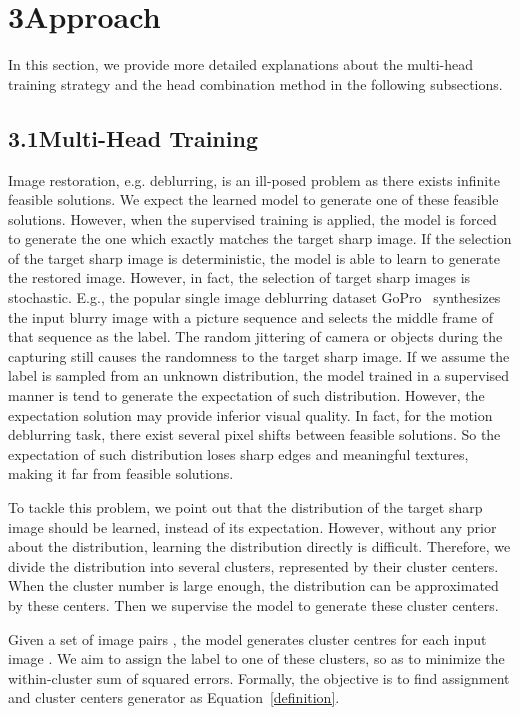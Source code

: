 \documentclass[letterpaper]{article} \usepackage{aaai23}  \usepackage{times}  \usepackage{helvet}  \usepackage{courier}  \usepackage[hyphens]{url}  \usepackage{graphicx} \urlstyle{rm} \def\UrlFont{\rm}  \usepackage{natbib}  \usepackage{caption} \frenchspacing  \setlength{\pdfpagewidth}{8.5in} \setlength{\pdfpageheight}{11in} \usepackage{algorithm}
\begin{document}
\section{3\quad Approach}

In this section, we provide more detailed explanations about the multi-head training strategy and the head combination method in the following subsections. 

\subsection{3.1\quad Multi-Head Training}

Image restoration, e.g. deblurring, is an ill-posed problem as there exists infinite feasible solutions. We expect the learned model to generate one of these feasible solutions. However, when the supervised training is applied, the model is forced to generate the one which exactly matches the target sharp image. If the selection of the target sharp image is deterministic, the model is able to learn to generate the restored image. However, in fact, the selection of target sharp images is stochastic. E.g., the popular single image deblurring dataset GoPro~\cite{Nah_2017_CVPR} synthesizes the input blurry image with a picture sequence and selects the middle frame of that sequence as the label. The random jittering of camera or objects during the capturing still causes the randomness to the target sharp image. If we assume the label is sampled from an unknown distribution, the model trained in a supervised manner is tend to generate the expectation of such distribution. However, the expectation solution may provide inferior visual quality. In fact, for the motion deblurring task, there exist several pixel shifts between feasible solutions. So the expectation of such distribution loses sharp edges and meaningful textures, making it far from feasible solutions.

To tackle this problem, we point out that the distribution of the target sharp image should be learned, instead of its expectation. 
However, without any prior about the distribution, learning the distribution directly is difficult. Therefore, we divide the distribution into several clusters, represented by their cluster centers. When the cluster number is large enough, the distribution can be approximated by these centers. 
Then we supervise the model to generate these cluster centers. 

Given a set of image pairs , the model generates  cluster centres  for each input image . We aim to assign the label  to one of these clusters, so as to minimize the within-cluster sum of squared errors. Formally, the objective is to find assignment  and cluster centers generator  as Equation~\ref{definition}.
\end{document}
